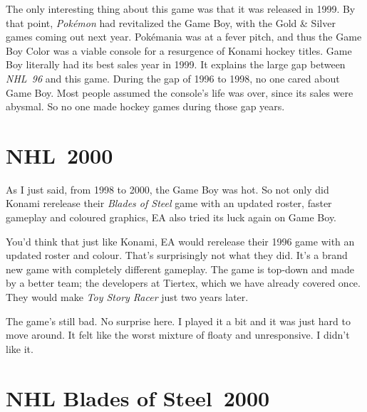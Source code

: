 \documentclass{book}
\let\oldcenter\center
\let\oldendcenter\endcenter
\renewenvironment{center}{\setlength\topsep{0pt}\oldcenter}{\oldendcenter}
\begin{document}
The only interesting thing about this game was that it was released in 1999. By that point, \emph{Pokémon} had revitalized the Game Boy, with the Gold \& Silver games coming out next year. Pokémania was at a fever pitch, and thus the Game Boy Color was a viable console for a resurgence of Konami hockey titles. Game Boy literally had its best sales year in 1999. It explains the large gap between \emph{NHL 96} and this game. During the gap of 1996 to 1998, no one cared about Game Boy. Most people assumed the console’s life was over, since its sales were abysmal. So no one made hockey games during those gap years.

\FloatBarrier\needspace{10mm}\section*{NHL 2000}\nopagebreak[4]

\begin{center}
\vspace{8pt}
\quad\vspace{4pt}
\end{center}

As I just said, from 1998 to 2000, the Game Boy was hot. So not only did Konami rerelease their \emph{Blades of Steel} game with an updated roster, faster gameplay and coloured graphics, EA also tried its luck again on Game Boy.

You’d think that just like Konami, EA would rerelease their 1996 game with an updated roster and colour. That’s surprisingly not what they did. It’s a brand new game with completely different gameplay. The game is top-down and made by a better team; the developers at Tiertex, which we have already covered once. They would make \emph{Toy Story Racer} just two years later.

The game’s still bad. No surprise here. I played it a bit and it was just hard to move around. It felt like the worst mixture of floaty and unresponsive. I didn’t like it.

\FloatBarrier\needspace{10mm}\section*{NHL Blades of Steel 2000}\nopagebreak[4]

\begin{center}
\vspace{8pt}
\quad\vspace{4pt}
\end{center}
\end{document}
